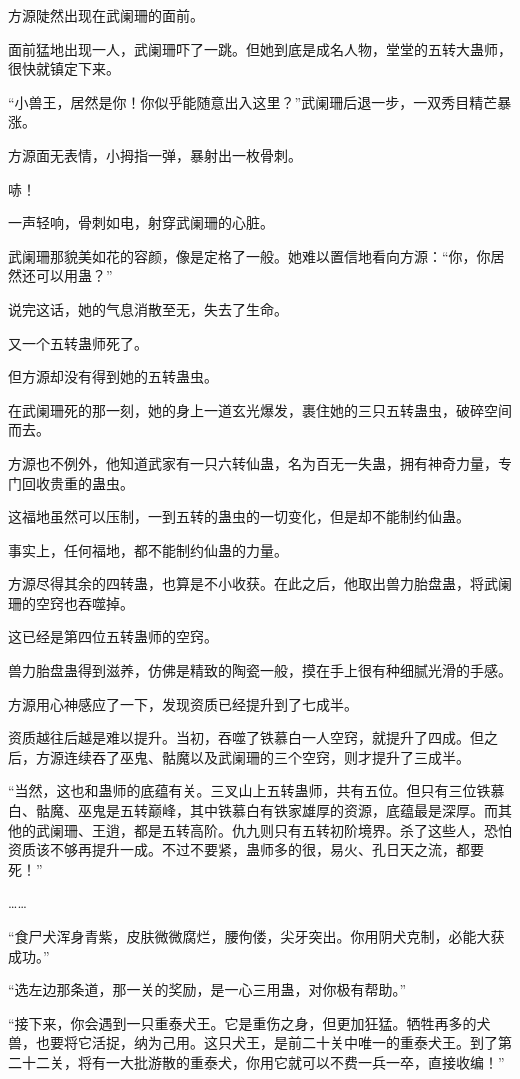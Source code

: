 \begin{this_body}
方源陡然出现在武阑珊的面前。

面前猛地出现一人，武阑珊吓了一跳。但她到底是成名人物，堂堂的五转大蛊师，很快就镇定下来。

“小兽王，居然是你！你似乎能随意出入这里？”武阑珊后退一步，一双秀目精芒暴涨。

方源面无表情，小拇指一弹，暴射出一枚骨刺。

哧！

一声轻响，骨刺如电，射穿武阑珊的心脏。

武阑珊那貌美如花的容颜，像是定格了一般。她难以置信地看向方源：“你，你居然还可以用蛊？”

说完这话，她的气息消散至无，失去了生命。

又一个五转蛊师死了。

但方源却没有得到她的五转蛊虫。

在武阑珊死的那一刻，她的身上一道玄光爆发，裹住她的三只五转蛊虫，破碎空间而去。

方源也不例外，他知道武家有一只六转仙蛊，名为百无一失蛊，拥有神奇力量，专门回收贵重的蛊虫。

这福地虽然可以压制，一到五转的蛊虫的一切变化，但是却不能制约仙蛊。

事实上，任何福地，都不能制约仙蛊的力量。

方源尽得其余的四转蛊，也算是不小收获。在此之后，他取出兽力胎盘蛊，将武阑珊的空窍也吞噬掉。

这已经是第四位五转蛊师的空窍。

兽力胎盘蛊得到滋养，仿佛是精致的陶瓷一般，摸在手上很有种细腻光滑的手感。

方源用心神感应了一下，发现资质已经提升到了七成半。

资质越往后越是难以提升。当初，吞噬了铁慕白一人空窍，就提升了四成。但之后，方源连续吞了巫鬼、骷魔以及武阑珊的三个空窍，则才提升了三成半。

“当然，这也和蛊师的底蕴有关。三叉山上五转蛊师，共有五位。但只有三位铁慕白、骷魔、巫鬼是五转巅峰，其中铁慕白有铁家雄厚的资源，底蕴最是深厚。而其他的武阑珊、王逍，都是五转高阶。仇九则只有五转初阶境界。杀了这些人，恐怕资质该不够再提升一成。不过不要紧，蛊师多的很，易火、孔日天之流，都要死！”

……

“食尸犬浑身青紫，皮肤微微腐烂，腰佝偻，尖牙突出。你用阴犬克制，必能大获成功。”

“选左边那条道，那一关的奖励，是一心三用蛊，对你极有帮助。”

“接下来，你会遇到一只重泰犬王。它是重伤之身，但更加狂猛。牺牲再多的犬兽，也要将它活捉，纳为己用。这只犬王，是前二十关中唯一的重泰犬王。到了第二十二关，将有一大批游散的重泰犬，你用它就可以不费一兵一卒，直接收编！”


\end{this_body}
